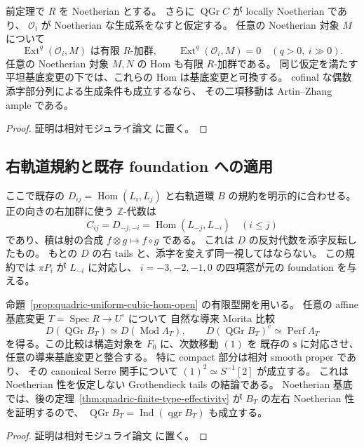 \begin{lemma}
\label{lem:relative-cubic-coherent-cohomology}
前定理で $R$ を Noetherian とする。
さらに $\operatorname{QGr}C$ が locally Noetherian であり、
$\mathcal O_i$ が Noetherian な生成系をなすと仮定する。
任意の Noetherian 対象 $M$ について
\[
 \operatorname{Ext}^q(\mathcal O_i,M)
 \text{ は有限 }R\text{-加群},\qquad
 \operatorname{Ext}^{q}(\mathcal O_i,M)=0
 \quad(q>0,\ i\gg0).
 \tag{CT-finite}\label{eq:cubic-tails-coherent-finiteness}
\]
任意の Noetherian 対象 $M,N$ の Hom も有限 $R$-加群である。
同じ仮定を満たす平坦基底変更の下では、これらの Hom は基底変更と可換する。
cofinal な偶数添字部分列による生成条件も成立するなら、
その二項移動は Artin--Zhang ample である。
\end{lemma}
\begin{proof}
証明は相対モジュライ論文 \cite[\texttt{relative_cubic_tails}]{QuadricModuli2026} に置く。
\end{proof}

\subsection{右軌道規約と既存 foundation への適用}

ここで既存の $D_{ij}=\operatorname{Hom}(L_i,L_j)$ と右軌道環
$B$ の規約を明示的に合わせる。正の向きの右加群に使う
$\mathbb Z$-代数は
\[
 C_{ij}=D_{-j,-i}=\operatorname{Hom}(L_{-j},L_{-i})\quad(i\le j)
 \tag{CT-right}\label{eq:cubic-tails-right-convention}
\]
であり、積は射の合成 $f\otimes g\mapsto f\circ g$ である。
これは $D$ の反対代数を添字反転したもの。
もとの $D$ の右 tails と、添字を変えず同一視してはならない。
この規約では $\pi P_i$ が $L_{-i}$ に対応し、
$i=-3,-2,-1,0$ の四項窓が元の foundation を与える。

\begin{proposition}
\label{prop:quadric-canonical-cubic-tails}
命題~\ref{prop:quadric-uniform-cubic-hom-open} の有限型開を用いる。
任意の affine 基底変更 $T=\operatorname{Spec}R\to U^\circ$ について
自然な導来 Morita 比較
\[
 D(\operatorname{QGr}B_T)\simeq D(\operatorname{Mod}\Lambda_T),\qquad
 D(\operatorname{QGr}B_T)^c\simeq\operatorname{Perf}\Lambda_T
 \tag{QT-compact}\label{eq:quadric-tails-compact-comparison}
\]
を得る。この比較は構造対象を $F_0$ に、次数移動 $(1)$ を
既存の $\mathsf s$ に対応させ、任意の導来基底変更と整合する。
特に compact 部分は相対 smooth proper であり、
その canonical Serre 関手について
$(1)^2\simeq S^{-1}[2]$ が成立する。
これは Noetherian 性を仮定しない Grothendieck tails の結論である。
Noetherian 基底では、後の定理~\ref{thm:quadric-finite-type-effectivity} が
$B_T$ の左右 Noetherian 性を証明するので、
$\operatorname{QGr}B_T=\operatorname{Ind}(\operatorname{qgr}B_T)$
も成立する。
\end{proposition}
\begin{proof}
証明は相対モジュライ論文 \cite[\texttt{relative_cubic_tails}]{QuadricModuli2026} に置く。
\end{proof}

